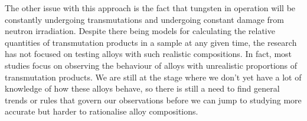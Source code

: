 \documentclass[12pt, a4paper]{article}
\begin{document}
		The other issue with this approach is the fact that tungsten in operation will be constantly undergoing transmutations and undergoing constant damage from neutron irradiation. Despite there being models for calculating the relative quantities of transmutation products in a sample at any given time, the research has not focused on testing alloys with such realistic compositions. In fact, most studies focus on observing the behaviour of alloys with unrealistic proportions of transmutation products. We are still at the stage where we don't yet have a lot of knowledge of how these alloys behave, so there is still a need to find general trends or rules that govern our observations before we can jump to studying more accurate but harder to rationalise alloy compositions.
	\begin{comment}	
	\begin{itemize}
		\item \cite{abernethy2016predicting}
		\begin{itemize}
			\item Fabrication of structural divertor components lacks study.
			\item 14.1\;MeV neutron sources lacking, need to study damage cascades.
			\item Molecular dynamics models damage cascades, but do not take many things into account such as transmutations.
			\item DPA is a flawed measure as vacancies and interstitials can annihilate.
			\item DFT is used for the electronic structure of vacancies and interstitials. DFT results vary depending on the functional and basis sets used. They also assume 0\;K.
			\item Experiments are not standardised. They are done at varying temperatures and dpa rates.
			\item Damage is highly dependent and non-linear w.r.t. kinetics (dpa rate and temperature), they greatly affect total damage.
			\item It is hard to extrapolate ion-irradiation damage to neutron irradiation as it lacks transmutation and the interactions are not the same (ions present electronic slowing which is non-linear).
			\item Often simulation results are not detailed as much as they should be---parameters missing, corrections to results not fully detailed or properly justified.
		\end{itemize}
	\end{itemize}
	\end{comment}
		
	
\end{document}

